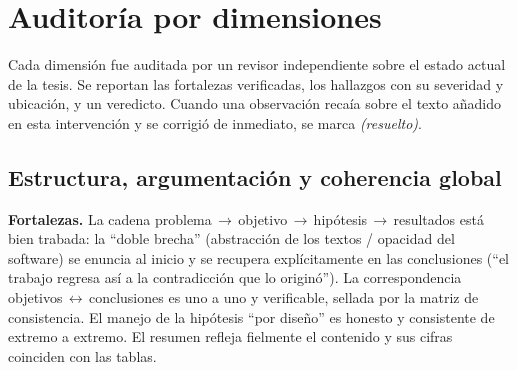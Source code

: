 \documentclass[11pt,a4paper]{article}
\begin{document}
\section{Auditoría por dimensiones}

Cada dimensión fue auditada por un revisor independiente sobre el estado actual de la tesis. Se
reportan las fortalezas verificadas, los hallazgos con su severidad y ubicación, y un veredicto.
Cuando una observación recaía sobre el texto añadido en esta intervención y se corrigió de
inmediato, se marca \textit{(resuelto)}.

\subsection{Estructura, argumentación y coherencia global}

\textbf{Fortalezas.} La cadena problema\,$\to$\,objetivo\,$\to$\,hipótesis\,$\to$\,resultados está bien
trabada: la ``doble brecha'' (abstracción de los textos / opacidad del software) se enuncia al inicio
y se recupera explícitamente en las conclusiones (``el trabajo regresa así a la contradicción que lo
originó''). La correspondencia objetivos\,$\leftrightarrow$\,conclusiones es uno a uno y verificable, sellada
por la matriz de consistencia. El manejo de la hipótesis ``por diseño'' es honesto y consistente de
extremo a extremo. El resumen refleja fielmente el contenido y sus cifras coinciden con las tablas.
\end{document}
